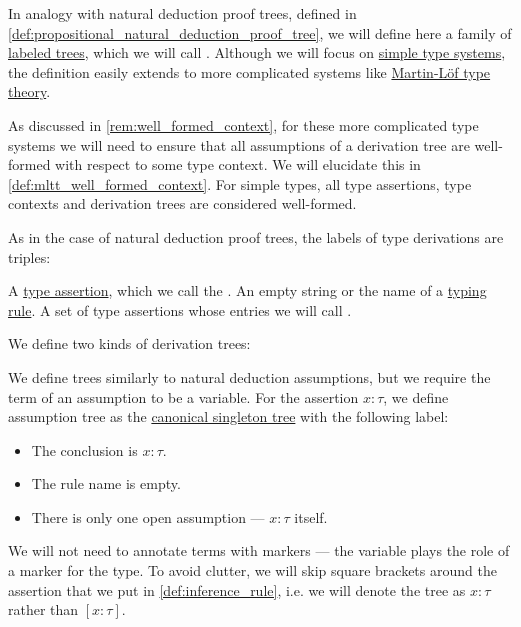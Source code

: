 \begin{definition}\label{def:type_derivation_tree}\mimprovised
  In analogy with natural deduction proof trees, defined in \cref{def:propositional_natural_deduction_proof_tree}, we will define here a family of \hyperref[def:labeled_tree]{labeled trees}, which we will call . Although we will focus on \hyperref[def:simple_type_system]{simple type systems}, the definition easily extends to more complicated systems like \hyperref[def:mltt]{Martin-L\"of type theory}.

  As discussed in \cref{rem:well_formed_context}, for these more complicated type systems we will need to ensure that all assumptions of a derivation tree are well-formed with respect to some type context. We will elucidate this in \cref{def:mltt_well_formed_context}. For simple types, all type assertions, type contexts and derivation trees are considered well-formed.

  As in the case of natural deduction proof trees, the labels of type derivations are triples:
  \begin{thmenum}[series=def:type_derivation_tree]
     A \hyperref[def:type_assertion]{type assertion}, which we call the .
     An empty string or the name of a \hyperref[def:simple_typing_rule]{typing rule}.
     A set of type assertions whose entries we will call .
  \end{thmenum}

  We define two kinds of derivation trees:
  \begin{thmenum}[resume=def:type_derivation_tree]
     We define  trees similarly to natural deduction assumptions, but we require the term of an assumption to be a variable. For the assertion \( x: \tau \), we define assumption tree as the \hyperref[def:canonical_singleton_tree]{canonical singleton tree} with the following label:
    \begin{itemize}
      \item The conclusion is \( x: \tau \).
      \item The rule name is empty.
      \item There is only one open assumption --- \( x: \tau \) itself.
    \end{itemize}

    We will not need to annotate terms with markers --- the variable plays the role of a marker for the type. To avoid clutter, we will skip square brackets around the assertion that we put in \cref{def:inference_rule}, i.e. we will denote the tree as \( x: \tau \) rather than \( [x: \tau] \).


\end{thmenum}
\end{definition}

